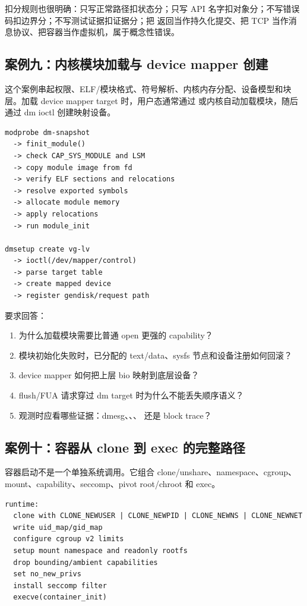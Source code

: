 扣分规则也很明确：只写正常路径扣状态分；只写 API 名字扣对象分；不写错误码扣边界分；不写测试证据扣证据分；把  返回当作持久化提交、把 TCP 当作消息协议、把容器当作虚拟机，属于概念性错误。

\subsection{案例九：内核模块加载与 device mapper 创建}

这个案例串起权限、ELF/模块格式、符号解析、内核内存分配、设备模型和块层。加载 device mapper target 时，用户态通常通过  或内核自动加载模块，随后通过 dm ioctl 创建映射设备。

\begin{lstlisting}
modprobe dm-snapshot
  -> finit_module()
  -> check CAP_SYS_MODULE and LSM
  -> copy module image from fd
  -> verify ELF sections and relocations
  -> resolve exported symbols
  -> allocate module memory
  -> apply relocations
  -> run module_init

dmsetup create vg-lv
  -> ioctl(/dev/mapper/control)
  -> parse target table
  -> create mapped device
  -> register gendisk/request path
\end{lstlisting}

要求回答：

\begin{enumerate}
\tightlist
\item 为什么加载模块需要比普通 open 更强的 capability？
\item 模块初始化失败时，已分配的 text/data、sysfs 节点和设备注册如何回滚？
\item device mapper 如何把上层 bio 映射到底层设备？
\item flush/FUA 请求穿过 dm target 时为什么不能丢失顺序语义？
\item 观测时应看哪些证据：dmesg、、、 还是 block trace？
\end{enumerate}

\subsection{案例十：容器从 clone 到 exec 的完整路径}

容器启动不是一个单独系统调用。它组合 clone/unshare、namespace、cgroup、mount、capability、seccomp、pivot root/chroot 和 exec。

\begin{lstlisting}
runtime:
  clone with CLONE_NEWUSER | CLONE_NEWPID | CLONE_NEWNS | CLONE_NEWNET
  write uid_map/gid_map
  configure cgroup v2 limits
  setup mount namespace and readonly rootfs
  drop bounding/ambient capabilities
  set no_new_privs
  install seccomp filter
  execve(container_init)
\end{lstlisting}

